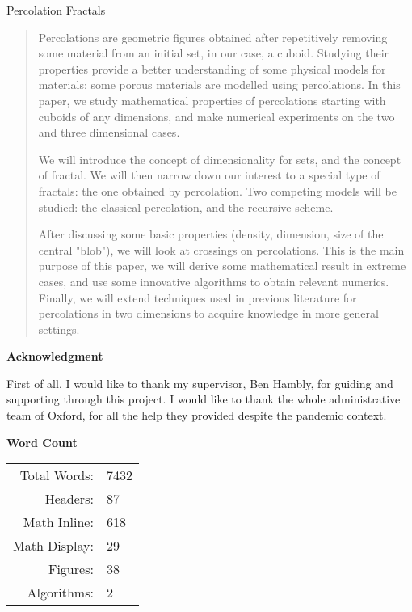 \documentclass[a4paper, 11pt]{article}
\begin{document}
	
	\begin{center}
		\LARGE Percolation Fractals
	\end{center}
	\vspace{0.5cm}
	\begin{abstract}
		Percolations are geometric figures obtained after repetitively removing some material from an initial set, in our case, a cuboid.
		Studying their properties provide a better understanding of some physical models for materials: some porous materials are modelled using percolations.
		In this paper, we study mathematical properties of percolations starting with cuboids of any dimensions, and make numerical experiments on the two and three dimensional cases.
		
		We will introduce the concept of dimensionality for sets, and the concept of fractal.
		We will then narrow down our interest to a special type of fractals: the one obtained by percolation.
		Two competing models will be studied: the classical percolation, and the recursive scheme.
		
		After discussing some basic properties (density, dimension, size of the central "blob"), we will look at crossings on percolations.
		This is the main purpose of this paper, we will derive some mathematical result in extreme cases, and use some innovative algorithms to obtain relevant numerics.
		Finally, we will extend techniques used in previous literature for percolations in two dimensions to acquire knowledge in more general settings. 
	\end{abstract}
	
	\vspace{2.5cm}
	\begin{center}
		\textbf{Acknowledgment}
	\end{center}
	{
		\small
		\hspace{1cm}
		First of all, I would like to thank my supervisor, Ben Hambly, for guiding and supporting through this project.
		I would like to thank the whole administrative team of Oxford, for all the help they provided despite the pandemic context.
	}

	\vspace{2.5cm}
	\begin{center}
		\textbf{Word Count}
	\end{center}
	\begin{center}
		\begin{tabular}{r l}
			Total Words: & 7432 \\
			Headers: & 87 \\
			Math Inline: & 618 \\
			Math Display: & 29 \\
			Figures: & 38 \\
			Algorithms: & 2 \\
		\end{tabular}
	\end{center}
	
\end{document}

